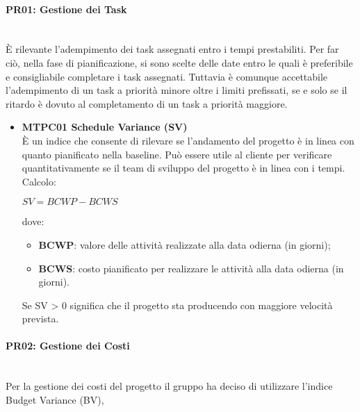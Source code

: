 \paragraph{PR01: Gestione dei Task} \-\\
È rilevante l'adempimento dei task assegnati entro i tempi prestabiliti. Per far ciò, nella fase di pianificazione, si sono scelte delle date entro le quali è preferibile e consigliabile completare i task assegnati. Tuttavia è comunque accettabile l'adempimento di un task a priorità minore oltre i limiti prefissati, se e solo se il ritardo è dovuto al completamento di un task a priorità maggiore.

\begin{itemize}

	\item \textbf{MTPC01 Schedule Variance (SV)}\-\\
È un indice che consente di rilevare se l'andamento del progetto è in linea con quanto pianificato nella baseline\glossario. Può essere utile al cliente per verificare quantitativamente se il team di sviluppo del progetto è in linea con i tempi. \-\\
Calcolo:\-\\
\begin{center}
	$SV = BCWP - BCWS$
\end{center}
dove:
\begin{itemize}
	\item \textbf{BCWP}: valore delle attività realizzate alla data odierna (in giorni);
	\item \textbf{BCWS}: costo pianificato per realizzare le attività alla data odierna (in giorni).
\end{itemize}
Se SV > 0 significa che il progetto sta producendo con maggiore velocità prevista.

\end{itemize}

\paragraph{PR02: Gestione dei Costi} \-\\
Per la gestione dei costi del progetto il gruppo ha deciso di utilizzare l'indice Budget Variance (BV),

